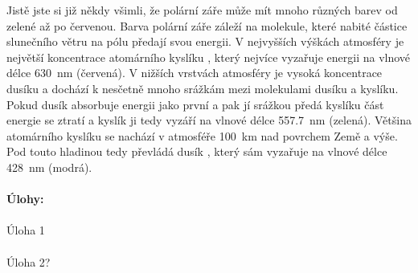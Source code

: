 \documentclass{../../../../style/mkimain}
\begin{document}
Jistě jste si již někdy všimli, že polární záře může mít mnoho různých barev od zelené až 
po červenou. Barva polární záře záleží na molekule, které nabité částice slunečního větru 
na pólu předají svou energii. V nejvyšších výškách atmosféry je největší koncentrace atomárního 
kyslíku , který nejvíce vyzařuje energii na vlnové délce \qty{630}{\nm} (červená). V nižších 
vrstvách atmosféry je vysoká koncentrace dusíku  a dochází k nesčetně mnoho srážkám mezi 
molekulami dusíku a kyslíku. Pokud dusík absorbuje energii jako první a pak jí srážkou předá 
kyslíku část energie se ztratí a kyslík ji tedy vyzáří na vlnové délce \qty{557.7}{\nm} (zelená).
Většina atomárního kyslíku se nachází v atmosféře \qty{100}{\km} nad povrchem Země a výše. Pod 
touto hladinou tedy převládá dusík , který sám vyzařuje na vlnové délce \qty{428}{\nm} (modrá).
\\
\\
\textbf{Úlohy:}
\\
\\
Úloha 1
\\
\\
Úloha 2?
\end{document}
